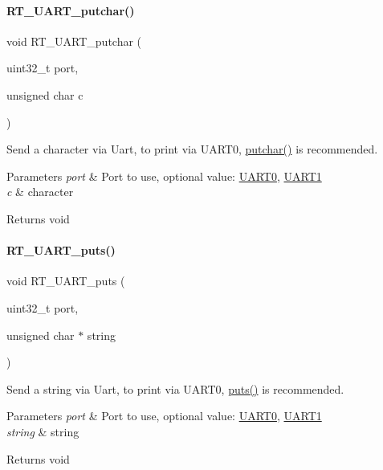 \paragraph{\texorpdfstring{R\+T\+\_\+\+U\+A\+R\+T\+\_\+putchar()}{RT\_UART\_putchar()}}
{\footnotesize\ttfamily void R\+T\+\_\+\+U\+A\+R\+T\+\_\+putchar (\begin{DoxyParamCaption}\item[{uint32\+\_\+t}]{port,  }\item[{unsigned char}]{c }\end{DoxyParamCaption})}



Send a character via Uart, to print via U\+A\+R\+T0, \mbox{\hyperlink{a00026_a948b7a0779c308ac5502c57e282e6933}{putchar()}} is recommended. 


\begin{DoxyParams}{Parameters}
{\em port} & Port to use, optional value\+: \mbox{\hyperlink{a00056_a0508661f121639ffdee7de2353a0def2}{U\+A\+R\+T0}}, \mbox{\hyperlink{a00056_a8d69bf04d07af4fbbab5a8bd291f65ff}{U\+A\+R\+T1}} \\
\hline
{\em c} & character \\
\hline
\end{DoxyParams}
\begin{DoxyReturn}{Returns}
void 
\end{DoxyReturn}
\mbox{\label{a00056_ad61c03a00ccd43875563c16f97d61af7}} 
\paragraph{\texorpdfstring{R\+T\+\_\+\+U\+A\+R\+T\+\_\+puts()}{RT\_UART\_puts()}}
{\footnotesize\ttfamily void R\+T\+\_\+\+U\+A\+R\+T\+\_\+puts (\begin{DoxyParamCaption}\item[{uint32\+\_\+t}]{port,  }\item[{unsigned char $\ast$}]{string }\end{DoxyParamCaption})}



Send a string via Uart, to print via U\+A\+R\+T0, \mbox{\hyperlink{a00026_a46036bd75b920766eef64eb7910c887d}{puts()}} is recommended. 


\begin{DoxyParams}{Parameters}
{\em port} & Port to use, optional value\+: \mbox{\hyperlink{a00056_a0508661f121639ffdee7de2353a0def2}{U\+A\+R\+T0}}, \mbox{\hyperlink{a00056_a8d69bf04d07af4fbbab5a8bd291f65ff}{U\+A\+R\+T1}} \\
\hline
{\em string} & string \\
\hline
\end{DoxyParams}
\begin{DoxyReturn}{Returns}
void 
\end{DoxyReturn}
